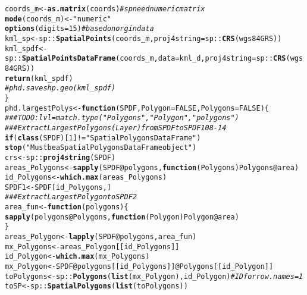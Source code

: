 \documentclass[a4paper,12pt,times,numbered,print,index]{Classes/PhDThesisPSnPDF}\usepackage[]{graphicx}\usepackage[]{color}
\makeatletter
\newcommand{\hlnum}[1]{\textcolor[rgb]{0.686,0.059,0.569}{#1}}%
\newcommand{\hlstr}[1]{\textcolor[rgb]{0.192,0.494,0.8}{#1}}%
\newcommand{\hlcom}[1]{\textcolor[rgb]{0.678,0.584,0.686}{\textit{#1}}}%
\newcommand{\hlopt}[1]{\textcolor[rgb]{0,0,0}{#1}}%
\newcommand{\hlstd}[1]{\textcolor[rgb]{0.345,0.345,0.345}{#1}}%
\newcommand{\hlkwa}[1]{\textcolor[rgb]{0.161,0.373,0.58}{\textbf{#1}}}%
\newcommand{\hlkwb}[1]{\textcolor[rgb]{0.69,0.353,0.396}{#1}}%
\newcommand{\hlkwc}[1]{\textcolor[rgb]{0.333,0.667,0.333}{#1}}%
\newcommand{\hlkwd}[1]{\textcolor[rgb]{0.737,0.353,0.396}{\textbf{#1}}}%
\newenvironment{kframe}{%
 \def\at@end@of@kframe{}%
 \ifinner\ifhmode%
  \def\at@end@of@kframe{\end{minipage}}%
  \begin{minipage}{\columnwidth}%
 \fi\fi%
 \def\FrameCommand##1{\hskip\@totalleftmargin \hskip-\fboxsep
 \colorbox{shadecolor}{##1}\hskip-\fboxsep
     \hskip-\linewidth \hskip-\@totalleftmargin \hskip\columnwidth}%
 \MakeFramed {\advance\hsize-\width
   \@totalleftmargin\z@ \linewidth\hsize
   \@setminipage}}%
 {\par\unskip\endMakeFramed%
 \at@end@of@kframe}
\newenvironment{knitrout}{}{} %
\renewenvironment{knitrout}{\begin{singlespace}}{\end{singlespace}}
\makeatother
\begin{document}
\begin{appendices}
\begin{knitrout}
\begin{kframe}
\begin{alltt}
        \hlstd{coords_m}  \hlkwb{<-} \hlkwd{as.matrix}\hlstd{(coords)} \hlcom{#sp need numeric matrix}
        \hlkwd{mode}\hlstd{(coords_m)}  \hlkwb{<-} \hlstr{"numeric"}
        \hlkwd{options}\hlstd{(}\hlkwc{digits}\hlstd{=}\hlnum{15}\hlstd{)}  \hlcom{#based on orgin data}
        \hlstd{kml_sp}  \hlkwb{<-} \hlstd{sp::}\hlkwd{SpatialPoints}\hlstd{(coords_m,} \hlkwc{proj4string} \hlstd{= sp::}\hlkwd{CRS}\hlstd{(wgs84GRS))}
        \hlstd{kml_spdf} \hlkwb{<-} \hlstd{sp::}\hlkwd{SpatialPointsDataFrame}\hlstd{(coords_m,} \hlkwc{data} \hlstd{=kml_d,} \hlkwc{proj4string}\hlstd{=sp::}\hlkwd{CRS}\hlstd{(wgs84GRS))}
        \hlkwd{return}\hlstd{(kml_spdf)}
        \hlcom{#phd.saveshp.geo(kml_spdf)}
\hlstd{\}}
\hlstd{phd.largestPolys}  \hlkwb{<-} \hlkwa{function}\hlstd{(}\hlkwc{SPDF}\hlstd{,} \hlkwc{Polygon} \hlstd{=} \hlnum{FALSE}\hlstd{,} \hlkwc{Polygons} \hlstd{=} \hlnum{FALSE}\hlstd{) \{}
        \hlcom{### TODO: lvl = match.type("Polygons", "Polygon", "polygons")}
        \hlcom{### Extract Largest Polygons(Layer) from SPDF to SPDF1 08-14}
        \hlkwa{if} \hlstd{(}\hlkwd{class}\hlstd{(SPDF)[}\hlnum{1}\hlstd{]} \hlopt{!=} \hlstr{"SpatialPolygonsDataFrame"}\hlstd{)}
        \hlkwd{stop}\hlstd{(}\hlstr{"Must be a SpatialPolygonsDataFrame object"}\hlstd{)}
        \hlstd{crs}  \hlkwb{<-} \hlstd{sp::}\hlkwd{proj4string}\hlstd{(SPDF)}
        \hlstd{areas_Polygons}  \hlkwb{<-}  \hlkwd{sapply}\hlstd{(SPDF}\hlopt{@}\hlkwc{polygons}\hlstd{,} \hlkwa{function}\hlstd{(}\hlkwc{Polygons}\hlstd{) Polygons}\hlopt{@}\hlkwc{area}\hlstd{)}
        \hlstd{id_Polygons}  \hlkwb{<-} \hlkwd{which.max}\hlstd{(areas_Polygons)}
        \hlstd{SPDF1}  \hlkwb{<-} \hlstd{SPDF[id_Polygons,]}
        \hlcom{### Extract Largest Polygon to SPDF2}
        \hlstd{area_fun}  \hlkwb{<-} \hlkwa{function}\hlstd{(}\hlkwc{polygons}\hlstd{) \{}
                \hlkwd{sapply}\hlstd{(polygons}\hlopt{@}\hlkwc{Polygons}\hlstd{,} \hlkwa{function}\hlstd{(}\hlkwc{Polygon}\hlstd{) Polygon}\hlopt{@}\hlkwc{area}\hlstd{)}
                \hlstd{\}}
        \hlstd{areas_Polygon} \hlkwb{<-} \hlkwd{lapply}\hlstd{(SPDF}\hlopt{@}\hlkwc{polygons}\hlstd{, area_fun)}
        \hlstd{mx_Polygons} \hlkwb{<-} \hlstd{areas_Polygon[[id_Polygons]]}
        \hlstd{id_Polygon}  \hlkwb{<-} \hlkwd{which.max}\hlstd{(mx_Polygons)}
        \hlstd{mx_Polygon}  \hlkwb{<-} \hlstd{SPDF}\hlopt{@}\hlkwc{polygons}\hlstd{[[id_Polygons]]}\hlopt{@}\hlkwc{Polygons}\hlstd{[[id_Polygon]]}
        \hlstd{toPolygons}  \hlkwb{<-} \hlstd{sp::}\hlkwd{Polygons}\hlstd{(}\hlkwd{list}\hlstd{(mx_Polygon), id_Polygon)} \hlcom{#ID for row.names = 1}
        \hlstd{toSP}  \hlkwb{<-} \hlstd{sp::}\hlkwd{SpatialPolygons}\hlstd{(}\hlkwd{list}\hlstd{(toPolygons))}

\end{alltt}
\end{kframe}
\end{knitrout}
\end{appendices}
\end{document}
